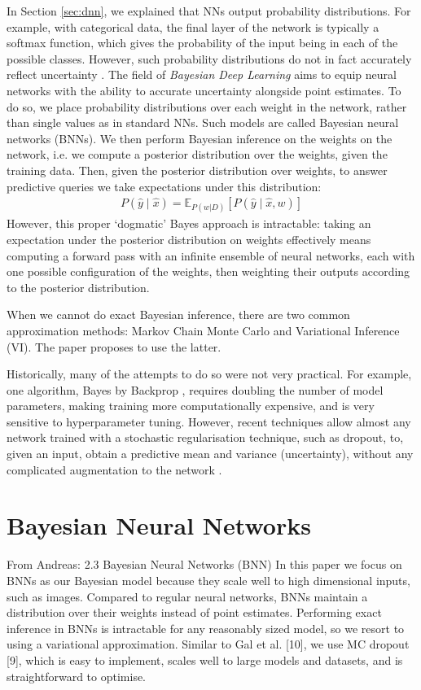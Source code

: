 \documentclass[11pt, a4paper, bibliography=totoc]{report}
\newcommand{\E}[2]{\mathbb{E}_{#1} \left[ #2 \right] }
\begin{document}
In Section \ref{sec:dnn}, we explained that NNs output probability distributions. For example, with categorical data, the final layer of the network is typically a softmax function, which gives the probability of the input being in each of the possible classes. However, such probability distributions do not in fact accurately reflect uncertainty \cite[p.~13]{Gal2017a}. The field of \textit{Bayesian Deep Learning} aims to equip neural networks with the ability to accurate uncertainty alongside point estimates. To do so, we place probability distributions over each weight in the network, rather than single values as in standard NNs. Such models are called Bayesian neural networks (BNNs). We then perform Bayesian inference on the weights on the network, i.e. we compute a posterior distribution over the weights, given the training data. Then, given the posterior distribution over weights, to answer predictive queries we take expectations under this distribution:
\begin{align*}
P(\hat{y} \mid \hat{x}) = \E{ P(w|D) }{P(\hat{y} \mid \hat{x}, w) }
\end{align*}
However, this proper ‘dogmatic’ Bayes approach is intractable: taking an expectation under the posterior distribution on weights effectively means computing a forward pass with an infinite ensemble of neural networks, each with one possible configuration of the weights, then weighting their outputs according to the posterior distribution.

When we cannot do exact Bayesian inference, there are two common approximation methods: Markov Chain Monte Carlo and Variational Inference (VI). The paper proposes to use the latter.


Historically, many of the attempts to do so were not very practical. For example, one algorithm, Bayes by Backprop \cite{Blundell2015}, requires doubling the number of model parameters, making training more computationally expensive, and is very sensitive to hyperparameter tuning. However, recent techniques allow almost any network trained with a stochastic regularisation technique, such as dropout, to, given an input, obtain a predictive mean and variance (uncertainty), without any complicated augmentation to the network \cite[p.~15]{Gal2017a}.

\section{Bayesian Neural Networks} \label{sec:bnns}
From Andreas:
2.3 Bayesian Neural Networks (BNN)
In this paper we focus on BNNs as our Bayesian model because they scale well to high dimensional
inputs, such as images. Compared to regular neural networks, BNNs maintain a distribution over
their weights instead of point estimates. Performing exact inference in BNNs is intractable for any
reasonably sized model, so we resort to using a variational approximation. Similar to Gal et al. [10],
we use MC dropout [9], which is easy to implement, scales well to large models and datasets, and is
straightforward to optimise.
\end{document}

